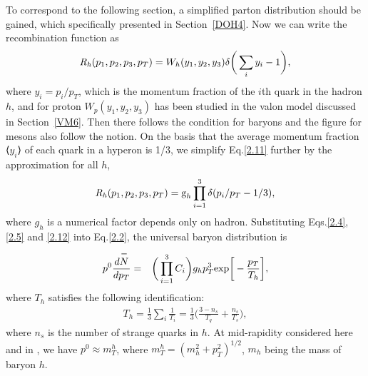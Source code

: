 \documentclass[twocolumn,aps,superscriptaddress,showpacs,nofootinbib,floatfix]{revtex4}
\begin{document}
To correspond to the following section, a simplified parton distribution should be gained, which specifically presented in Section~\ref{DOH4}. Now we can write the recombination function as
\begin{eqnarray}
{{\it R_{h}}(p_1,p_2,p_3,p_T)=W_{h}(y_1,y_2,y_3)\delta\bigg{(}\sum\limits_{i}y_i-1\bigg{)},}
\label{2.11}
\end{eqnarray}
where $y_i = p_i/p_T$, which is the momentum fraction of the $i$th quark in the hadron $h$, and for proton $W_p (y_1,y_2,y_3)$ has been studied in the valon model\cite{Hwa:2002mv} discussed in Section~\ref{VM6}. Then there follows the condition for baryons and the figure for mesons also follow the notion. On the basis that the average momentum fraction ⟨$y_i$⟩ of each quark in a hyperon is 1/3, we simplify Eq.\ref{2.11} further by the approximation for all $h$\cite{4u}, 
\begin{eqnarray}
	{{\it R_{h}}(p_1,p_2,p_3,p_T)={\text g}_h \prod \limits_{i=1}^3\delta(p_i/p_T-1/3),}
	\label{2.12}
\end{eqnarray}
where $g_h$ is a numerical factor depends only on hadron. Substituting Eqs.\ref{2.4},\ref{2.5} and \ref{2.12} into Eq.\ref{2.2}, the universal baryon distribution is
\begin{eqnarray}
	p^0{d\overset{\bm-}{N}\over dp_T}&=&\bigg(\prod \limits_{i=1}^3 C_i \bigg) g_h p_T^3 \text{exp}\bigg[-\frac{p_T}{T_h}\bigg],   
	\label{2.13}
\end{eqnarray}
where $T_h$ satisfies the following identification:
\begin{eqnarray}	T_h=\frac{1}{3}\sum\limits_i\frac{1}{T_i}=\frac{1}{3}\Big( \frac{3-n_s}{T_q}+\frac{n_s}{T_s} \Big),
	\label{2.14}
\end{eqnarray}
where $n_s$ is the number of strange quarks in $h$. At mid-rapidity considered here and in \cite{2u}, we have $p^0\approx m_T^h$, where $m_T^h=(m_h^2+p_T^2)^{1/2}$, $m_h$ being the mass of baryon $h$. 
\end{document}
